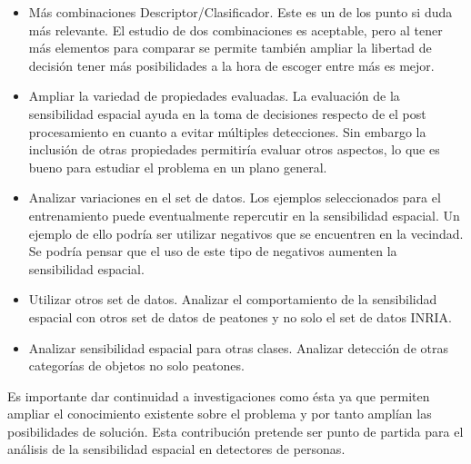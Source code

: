 \begin{itemize}
\item Más combinaciones Descriptor/Clasificador. Este es un de los punto si duda más relevante. El estudio de dos combinaciones es aceptable, pero al tener más elementos para comparar se permite también ampliar la libertad de decisión \ie tener más posibilidades a la hora de escoger entre más es mejor.
\item Ampliar la variedad de propiedades evaluadas. La evaluación de la sensibilidad espacial ayuda en la toma de decisiones respecto de el post procesamiento en cuanto a evitar múltiples detecciones. Sin embargo la inclusión de otras propiedades permitiría evaluar otros aspectos, lo que es bueno para estudiar el problema en un plano general.
\item Analizar variaciones en el set de datos. Los ejemplos seleccionados para el entrenamiento puede eventualmente repercutir en la sensibilidad espacial. Un ejemplo de ello podría ser utilizar negativos que se encuentren en la vecindad. Se podría pensar que el uso de este tipo de negativos aumenten la sensibilidad espacial.
\item Utilizar otros set de datos. Analizar el comportamiento de la sensibilidad espacial con otros set de datos de peatones y no solo el set de datos INRIA.
\item Analizar sensibilidad espacial para otras clases. Analizar detección de otras categorías de objetos no solo peatones.
\end{itemize}

Es importante dar continuidad a investigaciones como ésta ya que permiten ampliar el conocimiento existente sobre el problema y por tanto amplían las posibilidades de solución. Esta contribución pretende ser punto de partida para el análisis de la sensibilidad espacial en detectores de personas.